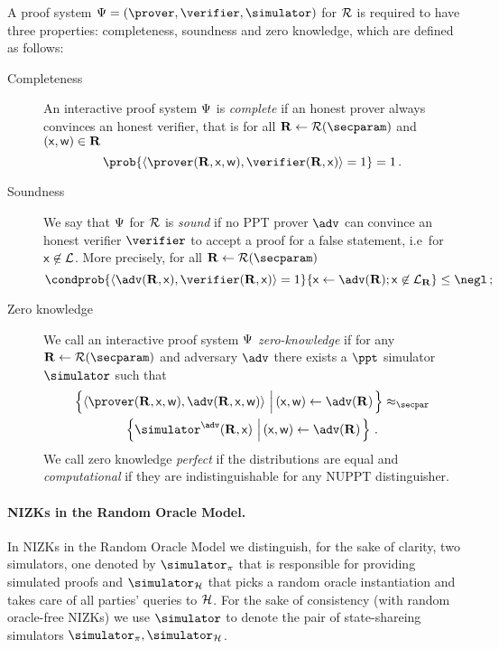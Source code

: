 \documentclass[runningheads,11pt]{llncs}
\theoremstyle{definition}
\begin{document}
A proof system $\proofsystem = (\prover, \verifier, \simulator)$ for $\mathcal{R}$ is required to have three properties: completeness, soundness and zero knowledge, which are defined as follows:
\begin{description}
	\item[Completeness] An interactive proof system $\mathrm{\Psi}$ is \emph{complete} if an honest prover always convinces an honest verifier, that is for all $\REL \gets \RELGEN(\secparam)$ and $(\mathsf{x}, \mathsf{w}) \in \mathbf{R}$
	\[
		\prob{\ip{\prover (\REL, \inp, \wit)}{\verifier (\REL, \inp)} = 1} = 1\,.
	\]
	\item[Soundness] We say that $\mathrm{\Psi}$ for $\mathcal{R}$ is \emph{sound} if no PPT prover $\adv$ can convince an honest verifier $\verifier$ to accept a proof for a false statement, i.e~for $\mathsf{x} \not\in\mathcal{L}$. More precisely, for all $\REL \gets \RELGEN(\secparam)$
	\[
		\condprob{\ip{\adv(\REL, \inp)}{\verifier(\REL, \inp)} = 1}{\inp \gets \adv(\REL); \inp \not\in \LANG_\REL} \leq \negl\,;
	\]
	\item[Zero knowledge] We call an interactive proof system $\mathrm{\Psi}$ \emph{zero-knowledge} if for any $\REL \gets \RELGEN(\secparam)$ and adversary $\adv$ there exists a $\ppt$ simulator $\simulator$ such that
	\begin{multline*}
	  \left\{\ip{\prover(\REL, \inp, \wit)}{\adv(\REL, \inp, \wit)} \,\left|\, (\inp, \wit) \gets \adv(\REL)\vphantom{\simulator^\adv}\right.\right\} \approx_\secpar
		\\
		\left\{\simulator^{\adv}(\REL, \inp)\,\left|\, (\inp, \wit) \gets \adv(\REL)\vphantom{\simulator^\adv}\right.\right\}\,.
	\end{multline*}
	We call zero knowledge \emph{perfect} if the distributions are equal and \emph{computational} if they are indistinguishable for any NUPPT distinguisher.
\end{description}

\paragraph{NIZKs in the Random Oracle Model.}
In NIZKs in the Random Oracle Model we distinguish, for the sake of clarity, two simulators, one denoted by $\simulator_\zkproof$ that is responsible for providing simulated proofs and $\simulator_\ro$ that picks a random oracle instantiation and takes care of all parties' queries to $\mathcal{H}$.
For the sake of consistency (with random oracle-free NIZKs) we use $\simulator$
to denote the pair of state-shareing simulators $\simulator_\zkproof,
\simulator_\ro$.
\end{document}
